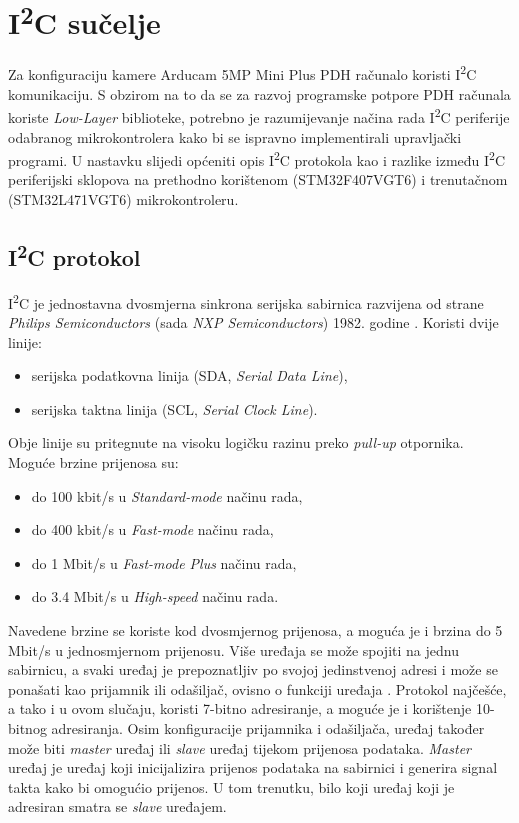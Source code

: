 \chapter{I\textsuperscript{2}C sučelje}

Za konfiguraciju kamere Arducam 5MP Mini Plus  PDH računalo koristi I\textsuperscript{2}C komunikaciju. S obzirom na to da se za razvoj programske potpore PDH računala koriste \textit{Low-Layer} biblioteke, potrebno je razumijevanje načina rada I\textsuperscript{2}C periferije odabranog mikrokontrolera kako bi se ispravno implementirali upravljački programi. U nastavku slijedi općeniti opis I\textsuperscript{2}C protokola kao i razlike između I\textsuperscript{2}C periferijski sklopova na prethodno korištenom (STM32F407VGT6) i trenutačnom (STM32L471VGT6) mikrokontroleru.

\section{I\textsuperscript{2}C protokol}

I\textsuperscript{2}C je jednostavna dvosmjerna sinkrona serijska sabirnica razvijena od strane \textit{Philips Semiconductors} (sada \textit{NXP Semiconductors}) 1982. godine \cite{i2c_wikipedia}. Koristi dvije linije:
\begin{itemize}
	\item serijska podatkovna linija (SDA, \textit{Serial Data Line}),
	\item serijska taktna linija (SCL, \textit{Serial Clock Line}).
\end{itemize}
Obje linije su pritegnute na visoku logičku razinu preko \textit{pull-up} otpornika. Moguće brzine prijenosa su:
\begin{itemize}
	\item do 100 kbit/s u \textit{Standard-mode} načinu rada, 
	\item do 400 kbit/s u \textit{Fast-mode} načinu rada,
	\item do 1 Mbit/s u \textit{Fast-mode Plus} načinu rada,
	\item do 3.4 Mbit/s u \textit{High-speed} načinu rada.
\end{itemize}
Navedene brzine se koriste kod dvosmjernog prijenosa, a moguća je i brzina do 5 Mbit/s u jednosmjernom prijenosu. Više uređaja se može spojiti na jednu sabirnicu, a svaki uređaj je prepoznatljiv po svojoj jedinstvenoj adresi i može se ponašati kao prijamnik ili odašiljač, ovisno o funkciji uređaja \cite{i2c_manual}. Protokol najčešće, a tako i u ovom slučaju, koristi 7-bitno adresiranje, a moguće je i korištenje 10-bitnog adresiranja. Osim konfiguracije prijamnika i odašiljača, uređaj također može biti \textit{master} uređaj ili \textit{slave} uređaj tijekom prijenosa podataka. \textit{Master} uređaj je uređaj koji inicijalizira prijenos podataka na sabirnici i generira signal takta kako bi omogućio prijenos. U tom trenutku, bilo koji uređaj koji je adresiran smatra se \textit{slave} uređajem.

